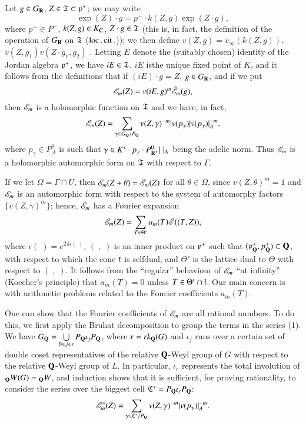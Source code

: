 Let $g \in G_{\mathbf{R}}$, $Z \in \mathfrak{T} \subset \mathfrak{p}^+$; we may write \cite{art1-key4}
$$
\exp (Z) \cdot g = p^- \cdot k (Z, g) \exp (Z \cdot g),
$$
where $p^- \in P^-$, $k(Z, g) \in K_{\mathbf{C}}$, $Z \cdot g \in \mathfrak{T}$ (this is, in fact, the definition of the operation of $G_{\mathbf{R}}$ on $\mathfrak{T}$ ($\operatorname{loc}. \operatorname{cit}.$)); we then define $v(Z, g)= v_{\infty} (k (Z,g))$. $v (Z, g_1) v (Z \cdot g_1, g_2)$ . Letting $E$ denote the (suitably chosen) identity of the Jordan algebra $\mathfrak{p}^+$, we have $iE \in \mathfrak{T}$, $iE$ is\pageoriginale the unique fixed point of $K$, and it follows from the definitions that if $(iE) \cdot g = Z$, $g \in G_{\mathbf{R}}$, and if we put
$$
\mathscr{E}_m (Z) = v (iE, g)^m \tilde{\mathscr{E}}_m(g),
$$
then $\mathscr{E}_m$ is a holomorphic function on $\mathfrak{T}$ and we have, in fact, 
\begin{equation}
\mathscr{E}_m (Z) = \sum\limits_{\gamma \in G_{\mathbf{Q}}/P_{\mathbf{Q}}} v (Z, \gamma)^{-m} | v(p_{\gamma}) | v(p_{\gamma})|^{-m}_A,  \label{art1-eq1}
\end{equation}
where $p_{\gamma} \in P^0_A$ is such that $\gamma \in K^\ast \cdot p_{\gamma} \cdot P^0_{\mathbf{R}}, |\;|_A$ being the adelic norm. Thus $\mathscr{E}_m$ is a holomorphic automorphic form on $\mathfrak{T}$ with respect to $\Gamma$.

If we let $\Omega = \Gamma \cap U$, then $\mathscr{E}_m(Z + \theta) = \mathscr{E}_m (Z)$ for all $\theta \in \Omega$, since $v (Z, \theta)^m = 1$ and $\mathscr{E}_m$ is an automorphic form with respect to the system of automorphy factors $\{v(Z,\gamma)^m\}$; hence, $\mathscr{E}_m$ has a Fourier expansion
$$
\mathscr{E}_m (Z) = \sum\limits_{T \in \Theta'} a_m (T) \mathscr{E} ((T,Z)),
$$
where $\epsilon (\;) = e^{2 \pi i (\;)}$, $(\;,\;)$ is an inner product on $\mathfrak{p}^+$ such that $(\mathfrak{p}^+_{\mathbf{Q}}, p^+_{\mathbf{Q}}) \subset \mathbf{Q}$, with respect to which the cone $\mathfrak{k}$ is selfdual, and $\Theta'$ is the lattice dual to $\Theta$ with respect to $(\;,\;)$. It follows from the ``regular'' behaviour of $\mathscr{E}_m$ ``at infinity''
 (Koecher's principle) that $a_m (T) = 0$ unless $T \in \Theta' \cap \mathfrak{k}$. Our main concern is with arithmetic problems related to the Fourier coefficients $a_m(T)$.

One can show that the Fourier coefficients of $\mathscr{E}_m$ are all rational numbers. To do this, we first apply the Bruhat decomposition to group the terms in the series (1). We have $G_{\mathbf{Q}} = \bigcup\limits_{0\leqslant j \leqslant r} P_{\mathbf{Q}} \iota_j P_{\mathbf{Q}}$, where $r = r k_{\mathbf{Q}} (G)$ and $\iota_j$ runs over a certain set of double coset representatives of the relative $\mathbf{Q}$-Weyl group of $G$ with respect to the relative $\mathbf{Q}$-Weyl group of $L$. In particular, $\iota_r$ represents the total involution of ${}_{\mathbf{Q}}W(G) = {}_{\mathbf{Q}} W$, and induction shows that it is sufficient, for proving rationality, to consider the series over the biggest cell $\mathfrak{C}^\ast = P_{\mathbf{Q}} \iota_r P_{\mathbf{Q}}$:
\begin{equation}
\mathscr{E}_m^\ast (Z) = \sum\limits_{\gamma \in \mathfrak{C}^\ast / P_{\mathbf{Q}}}  v (Z, \gamma)^{-m} | v (p_{\gamma})|^{-m}_A. \label{art1-eq2}
\end{equation}

